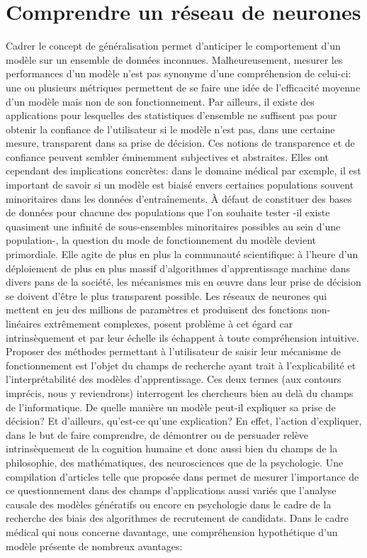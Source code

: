 \newpage

\section{Comprendre un réseau de neurones}
\label{sec:interprétabilitéModel}
Cadrer le concept de généralisation permet d'anticiper le comportement d'un modèle sur un ensemble de données inconnues. Malheureusement, mesurer les performances d'un modèle n'est pas synonyme d'une compréhension de celui-ci: une ou plusieurs métriques permettent de se faire une idée de l'efficacité moyenne d'un modèle mais non de son fonctionnement. Par ailleurs, il existe des applications pour lesquelles des statistiques d'ensemble ne suffisent pas pour obtenir la confiance de l'utilisateur si le modèle n'est pas, dans une certaine mesure, transparent dans sa prise de décision. Ces notions de transparence et de confiance peuvent sembler éminemment subjectives et abstraites. Elles ont cependant des implications concrètes: dans le domaine médical par exemple, il est important de savoir si un modèle est biaisé envers certaines populations souvent minoritaires dans les données d'entraînements. À défaut de constituer des bases de données pour chacune des populations que l'on souhaite tester -il existe quasiment une infinité de sous-ensembles minoritaires possibles au sein d'une population-, la question du mode de fonctionnement du modèle devient primordiale. Elle agite de plus en plus la communauté scientifique: à l'heure d'un déploiement de plus en plus massif d'algorithmes d'apprentissage machine dans divers pans de la société, les mécanismes mis en \oe uvre dans leur prise de décision se doivent d'être le plus transparent possible. Les réseaux de neurones qui mettent en jeu des millions de paramètres et produisent des fonctions non-linéaires extrêmement complexes, posent problème à cet égard car intrinsèquement et par leur échelle ils échappent à toute compréhension intuitive. \\
Proposer des méthodes permettant à l'utilisateur de saisir leur mécanisme de fonctionnement est l'objet du champs de recherche ayant trait à l'explicabilité et l'interprétabilité des modèles d'apprentissage. Ces deux termes (aux contours imprécis, nous y reviendrons) interrogent les chercheurs bien au delà du champs de l'informatique. De quelle manière un modèle peut-il expliquer sa prise de décision? Et d'ailleurs, qu'est-ce qu'une explication? En effet, l'action d'expliquer, dans le but de faire comprendre, de démontrer ou de persuader relève intrinsèquement de la cognition humaine et donc aussi bien du champs de la philosophie, des mathématiques, des neurosciences que de la psychologie.  Une compilation d'articles telle que proposée dans \cite{escalanteExplainableInterpretableModels2018} permet de mesurer l'importance de ce questionnement dans des champs d'applications aussi variés que l'analyse causale des modèles génératifs ou encore en psychologie dans le cadre de la recherche des biais des algorithmes de recrutement de candidats. Dans le cadre médical qui nous concerne davantage, une compréhension hypothétique d'un modèle présente de nombreux avantages:
